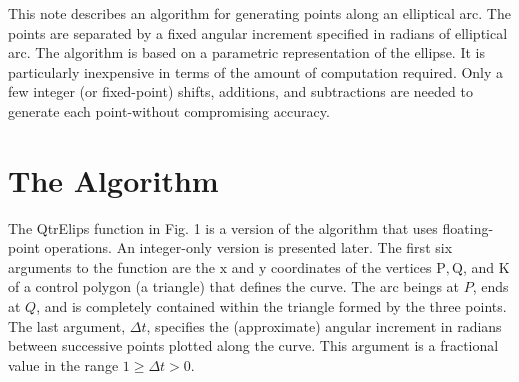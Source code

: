 This note describes an algorithm for generating points along an elliptical arc. The points are separated by a fixed angular increment specified in radians of elliptical arc. The algorithm is based on a parametric representation of the ellipse. It is particularly inexpensive in terms of the amount of computation required. Only a few integer (or fixed-point) shifts, additions, and subtractions are needed to generate each point-without compromising accuracy.

\section{The Algorithm}
The QtrElips function in Fig. 1 is a version of the algorithm that uses floating-point operations. An integer-only version is presented later. The first six arguments to the function are the $\mathrm{x}$ and $\mathrm{y}$ coordinates of the vertices $\mathrm{P}, \mathrm{Q}$, and $\mathrm{K}$ of a control polygon (a triangle) that defines the curve. The arc beings at $P$, ends at $Q$, and is completely contained within the triangle formed by the three points. The last argument, $\Delta t$, specifies the (approximate) angular increment in radians between successive points plotted along the curve. This argument is a fractional value in the range $1 \geq \Delta t>0$.
